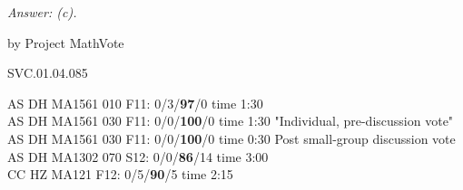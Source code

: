 {\it Answer:  (c).}  

\medskip

by Project MathVote

SVC.01.04.085

AS DH MA1561 010 F11: 0/3/{\bf97}/0 time 1:30  \\
AS DH MA1561 030 F11: 0/0/{\bf100}/0 time 1:30 "Individual, pre-discussion vote" \\
AS DH MA1561 030 F11: 0/0/{\bf100}/0 time 0:30 Post small-group discussion vote \\
AS DH MA1302 070 S12: 0/0/{\bf86}/14 time 3:00  \\
CC HZ MA121 F12: 0/5/{\bf90}/5 time 2:15  \\
